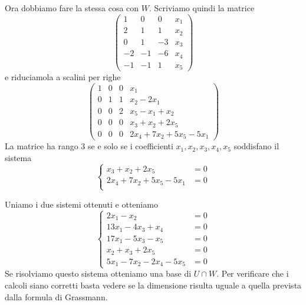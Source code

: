 Ora dobbiamo fare la stessa cosa con $W$. Scriviamo quindi la matrice
\[
	\begin{pmatrix}
		1  & 0  & 0  & x_1 \\
		2  & 1  & 1  & x_2 \\
		0  & 1  & -3 & x_3 \\
		-2 & -1 & -6 & x_4 \\
		-1 & -1 & 1  & x_5
	\end{pmatrix}
\]
e riduciamola a scalini per righe
\[
	\begin{pmatrix}
		1 & 0 & 0 & x_1                       \\
		0 & 1 & 1 & x_2 - 2x_1                \\
		0 & 0 & 2 & x_5 - x_1 + x_2           \\
		0 & 0 & 0 & x_3 + x_2 + 2x_5          \\
		0 & 0 & 0 & 2x_4 + 7x_2 + 5x_5 - 5x_1
	\end{pmatrix}
\]
La matrice ha rango 3 se e solo se i coefficienti $x_1, x_2, x_3, x_4, x_5$ soddisfano il
sistema
\[
	\begin{cases}
		x_3 + x_2 + 2x_5          & = 0 \\
		2x_4 + 7x_2 + 5x_5 - 5x_1 & = 0 \\
	\end{cases}
\]

Uniamo i due sistemi ottenuti e otteniamo
\[
	\begin{cases}
		2x_1 - x_2                & = 0 \\
		13x_1 - 4x_3 + x_4        & = 0 \\
		17x_1 - 5x_3 - x_5        & = 0 \\
		x_2 + x_3 + 2x_5          & = 0 \\
		5x_1 - 7x_2 - 2x_4 - 5x_5 & = 0
	\end{cases}
\]
Se risolviamo questo sistema otteniamo una base di $U \cap W$. Per verificare che i calcoli
siano corretti basta vedere se la dimensione risulta uguale a quella prevista dalla formula
di Grassmann.

